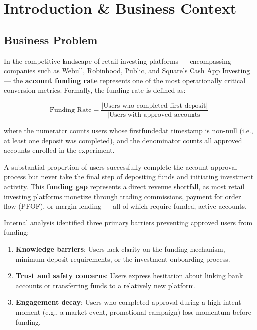 \documentclass[12pt,a4paper]{article}
\newcommand{\colname}[1]{{\ttfamily\renewcommand{\_}{\textunderscore\allowbreak}#1}}
\begin{document}
\section{Introduction \& Business Context}

\subsection{Business Problem}

In the competitive landscape of retail investing platforms — encompassing companies
such as Webull, Robinhood, Public, and Square's Cash App Investing — the
\textbf{account funding rate} represents one of the most operationally critical
conversion metrics. Formally, the funding rate is defined as:

\begin{equation}
  \text{Funding Rate} = \frac{|\text{Users who completed first deposit}|}{|\text{Users with approved accounts}|}
\end{equation}

\noindent where the numerator counts users whose \colname{first\_funded\_at} timestamp is
non-null (i.e., at least one deposit was completed), and the denominator counts all
approved accounts enrolled in the experiment.

A substantial proportion of users successfully complete the account approval process
but never take the final step of depositing funds and initiating investment activity.
This \textbf{funding gap} represents a direct revenue shortfall, as most retail investing
platforms monetize through trading commissions, payment for order flow (PFOF), or
margin lending — all of which require funded, active accounts.

Internal analysis identified three primary barriers preventing approved users from funding:

\begin{enumerate}[leftmargin=2em]
  \item \textbf{Knowledge barriers}: Users lack clarity on the funding mechanism,
    minimum deposit requirements, or the investment onboarding process.
  \item \textbf{Trust and safety concerns}: Users express hesitation about linking
    bank accounts or transferring funds to a relatively new platform.
  \item \textbf{Engagement decay}: Users who completed approval during a high-intent
    moment (e.g., a market event, promotional campaign) lose momentum before funding.
\end{enumerate}
\end{document}
